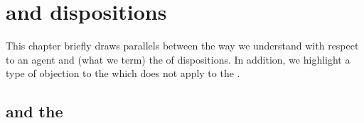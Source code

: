 \chapter{ and dispositions}
\label{cha:tc2-dispositions}


\begin{note}
  This chapter briefly draws parallels between the way we understand  with respect to an agent \tC{} and (what we term) the  of dispositions.
  In addition, we highlight a type of objection to the  which does not apply to the .
\end{note}



\section{ and the }
\label{sec:dispositions}


